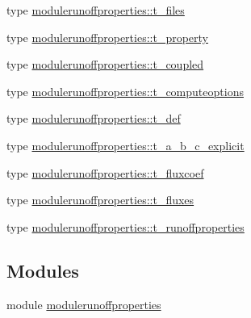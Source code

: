\begin{DoxyCompactItemize}
\item 
type \mbox{\hyperlink{structmodulerunoffproperties_1_1t__files}{modulerunoffproperties\+::t\+\_\+files}}
\item 
type \mbox{\hyperlink{structmodulerunoffproperties_1_1t__property}{modulerunoffproperties\+::t\+\_\+property}}
\item 
type \mbox{\hyperlink{structmodulerunoffproperties_1_1t__coupled}{modulerunoffproperties\+::t\+\_\+coupled}}
\item 
type \mbox{\hyperlink{structmodulerunoffproperties_1_1t__computeoptions}{modulerunoffproperties\+::t\+\_\+computeoptions}}
\item 
type \mbox{\hyperlink{structmodulerunoffproperties_1_1t__def}{modulerunoffproperties\+::t\+\_\+def}}
\item 
type \mbox{\hyperlink{structmodulerunoffproperties_1_1t__a__b__c__explicit}{modulerunoffproperties\+::t\+\_\+a\+\_\+b\+\_\+c\+\_\+explicit}}
\item 
type \mbox{\hyperlink{structmodulerunoffproperties_1_1t__fluxcoef}{modulerunoffproperties\+::t\+\_\+fluxcoef}}
\item 
type \mbox{\hyperlink{structmodulerunoffproperties_1_1t__fluxes}{modulerunoffproperties\+::t\+\_\+fluxes}}
\item 
type \mbox{\hyperlink{structmodulerunoffproperties_1_1t__runoffproperties}{modulerunoffproperties\+::t\+\_\+runoffproperties}}
\end{DoxyCompactItemize}
\subsection*{Modules}
\begin{DoxyCompactItemize}
\item 
module \mbox{\hyperlink{namespacemodulerunoffproperties}{modulerunoffproperties}}
\end{DoxyCompactItemize}
